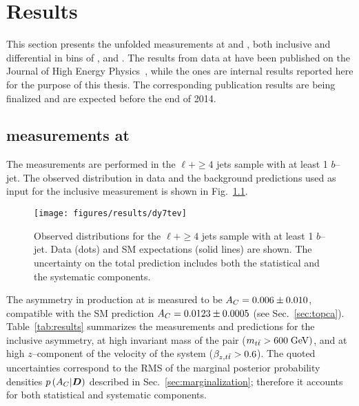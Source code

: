 \chapter{Results}
\label{sec:results}

This section presents the unfolded \ac{} measurements at \seventev{}
and \eighttev{}, both inclusive and differential in bins of \mtt{},
\pttt{} and \ytt{}. The results from data at \seventev{} have been
published on the Journal of High Energy Physics~\cite{Aad:2013cea},
while the \eighttev{} ones are internal results reported here for the
purpose of this thesis. The corresponding publication results are
being finalized and are expected before the end of 2014.

\section{\ac{} measurements at \seventev{}}
\label{sec:res7tev}

The measurements are performed in the $\ell{}+\ge4$ jets sample with at least 1
$b$--jet. The observed \dy{} distribution in data and the background
predictions used as input for the inclusive measurement is shown in
Fig.~\ref{fig:dy7tev}.

\begin{figure}[!htb]\centering
  \texttt{[image: figures/results/dy7tev]} 
  \caption{Observed \dy{} distributions for the $\ell{}+\ge4$ jets
    sample with at least 1 $b$--jet. Data (dots) and SM expectations
    (solid lines) are shown. The uncertainty on the total prediction
    includes both the statistical and the systematic components.}
  \label{fig:dy7tev}
\end{figure}

The asymmetry \ac{} in \ttbar{} production at \seventev{} is measured to be
$A_C{}= 0.006\pm0.010$, compatible with the SM prediction
$A_C{}=0.0123\pm0.0005$ (see Sec.~\ref{sec:topca}).
Table~\ref{tab:results} summarizes the
measurements and predictions for the inclusive asymmetry, at high
invariant mass of the \ttbar{} pair ($m_{t\bar{t}}{} >600 \; \mathrm{GeV}{})$, and at
high $z$--component of the velocity of the \ttbar{} system ($\beta_{z,t\bar{t}}{}>0.6$).
The quoted uncertainties correspond to the RMS of the marginal posterior
probability densities $p\left(A_C{}|\boldsymbol{D}{}\right)$ described in
Sec.~\ref{sec:marginalization}; therefore it accounts for both
statistical and systematic components.

